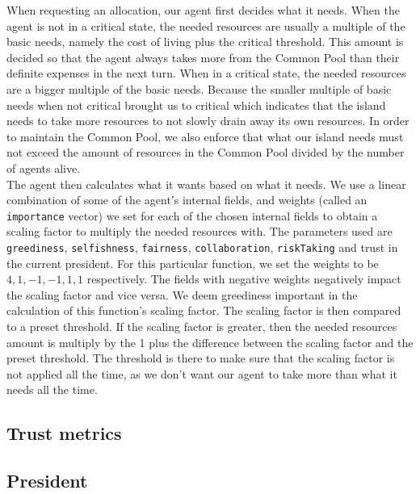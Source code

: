\noindent When requesting an allocation, our agent first decides what it needs. When the agent is not in a critical state, the needed resources are usually a multiple of the basic needs, namely the cost of living plus the critical threshold. This amount is decided so that the agent always takes more from the Common Pool than their definite expenses in the next turn. When in a critical state, the needed resources are a bigger multiple of the basic needs. Because the smaller multiple of basic needs when not critical brought us to critical which indicates that the island needs to take more resources to not slowly drain away its own resources. In order to maintain the Common Pool, we also enforce that what our island needs must not exceed the amount of resources in the Common Pool divided by the number of agents alive.\\

\noindent The agent then calculates what it wants based on what it needs. We use a linear combination of some of the agent's internal fields, and weights (called an \texttt{importance} vector) we set for each of the chosen internal fields to obtain a scaling factor to multiply the needed resources with. The parameters used are \texttt{greediness}, \texttt{selfishness}, \texttt{fairness}, \texttt{collaboration}, \texttt{riskTaking} and trust in the current president. For this particular function, we set the weights to be $4, 1, -1, -1, 1, 1$ respectively. The fields with negative weights negatively impact the scaling factor and vice versa. We deem greediness important in the calculation of this function's scaling factor. The scaling factor is then compared to a preset threshold. If the scaling factor is greater, then the needed resources amount is multiply by the 1 plus the difference between the scaling factor and the preset threshold. The threshold is there to make sure that the scaling factor is not applied all the time, as we don't want our agent to take more than what it needs all the time.

\subsection{Trust metrics}






\subsection{President}


